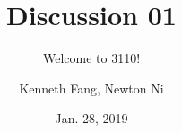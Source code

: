 \documentclass{beamer}
\title{Discussion 01}
\subtitle{Welcome to 3110!}
\author{Kenneth Fang, Newton Ni}
\institute{Cornell University}
\date{Jan. 28, 2019}
\begin{document}
    \begin{frame}
        \titlepage{}
    \end{frame}
\end{document}
